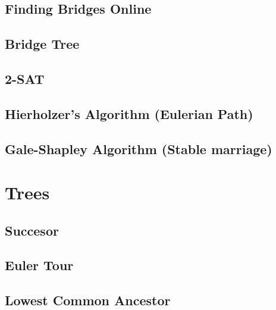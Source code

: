 \documentclass[10pt]{article}
\begin{document}
\begin{multicols*}{2}
\subsection{Finding Bridges Online}


\subsection{Bridge Tree}


\subsection{2-SAT}


\subsection{Hierholzer's Algorithm (Eulerian Path)}


\subsection{Gale-Shapley Algorithm (Stable marriage)}



\section{Trees}

\subsection{Succesor}


\subsection{Euler Tour}


\subsection{Lowest Common Ancestor}



\end{multicols*}
\end{document}

